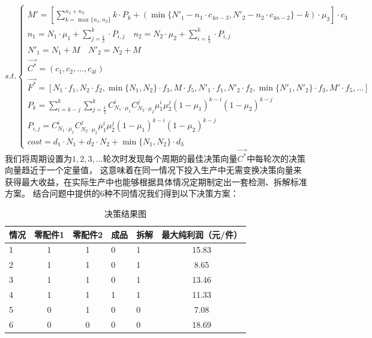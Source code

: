 \documentclass[withoutpreface,bwprint]{cumcmthesis} %
\begin{document}
\begin{equation*}
	s.t.\begin{cases}
		M'=[\sum_{k=\max \{n_{1},n_{2}\}}^{n_{1}+n_{2}}k\cdot P_{k}+(\min \{N'_{1}-n_{1}\cdot c_{4n-3},N'_{2}-n_{2}\cdot c_{4n-2}\}-k)\cdot \mu_{3}]\cdot c_{3}                                \\
		n_{1}=N_{1}\cdot \mu_{1}+\sum_{j=\frac{k}{2}}^{k}\cdot P_{i,j} \quad n_{2}=N_{2}\cdot \mu_{2}+\sum_{i=\frac{k}{2}}^{k}\cdot P_{i,j}                                                    \\
		N'_{1}=N_{1}+M \quad N'_{2}=N_{2}+M                                                                                                                                                    \\
		\vec{C^{*}}=(c_{1},c_{2},\dots,c_{4t})                                                                                                                                                 \\
		\vec{F^{*}}=[N_{1}\cdot f_{1},N_{2}\cdot f_{2},\min \{N_{1},N_{2}\}\cdot f_{3},M\cdot f_{5},N'_{1}\cdot f_{1},N'_{2}\cdot f_{2},\min \{N'_{1},N'_{2}\}\cdot f_{3},M'\cdot f_{5},\dots] \\
		P_{k}=\sum_{i=k-j}^{k}\sum_{j=\frac{k}{2}}^{k}C_{N_{1}\cdot\mu_{1}}^{i}C_{N_{2}\cdot\mu_{2}}^{j}\mu_{1}^{i}\mu_{2}^{j}(1-\mu_{1})^{k-i}(1-\mu_{2})^{k-j}                               \\
		P_{i,j}=C_{N_{1}\cdot\mu_{1}}^{i}C_{N_{2}\cdot\mu_{2}}^{j}\mu_{1}^{i}\mu_{2}^{j}(1-\mu_{1})^{k-i}(1-\mu_{2})^{k-j}                                                                     \\
		cost=d_{1}\cdot N_{1}+d_{2}\cdot N_{2}+\min \{ N_{1},N_{2}\}\cdot d_{3}
	\end{cases}
\end{equation*}
我们将周期设置为$1,2,3,\dots$轮次时发现每个周期的最佳决策向量$\vec{C^{*}}$中每轮次的决策向量趋近于一个定量值，
这意味着在同一情况下投入生产中无需变换决策向量来获得最大收益，在实际生产中也能够根据具体情况定期制定出一套检测、拆解标准方案。
结合问题中提供的6种不同情况我们得到以下决策方案：
\begin{longtable}{m{1.5cm}<{\centering}ccm{1.5cm}<{\centering}m{1.5cm}<{\centering}c}
	\caption{决策结果图}
	\label{tab:my-table}                    \\
	\hline
	情况 & 零配件1 & 零配件2 & 成品 & 拆解 & 最大纯利润（元/件） \\ \hline
	\endfirsthead
	\endhead
	\hline
	\endfoot
	\endlastfoot
	1  & 1    & 1    & 0  & 1  & 15.83      \\
	2  & 1    & 1    & 0  & 1  & 8.65       \\
	3  & 1    & 1    & 0  & 1  & 13.46      \\
	4  & 1    & 1    & 1  & 1  & 11.33      \\
	5  & 0    & 1    & 0  & 0  & 7.08       \\
	6  & 0    & 0    & 0  & 0  & 18.69      \\ \hline
\end{longtable}
\end{document}
